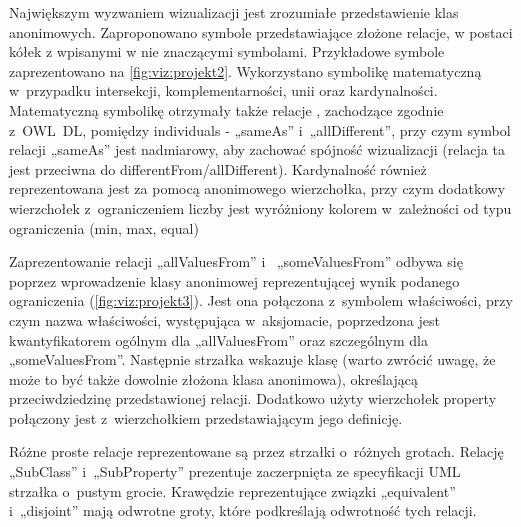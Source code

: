 
\par
Największym wyzwaniem wizualizacji jest zrozumiałe przedstawienie klas anonimowych. Zaproponowano symbole przedstawiające złożone relacje, 
w postaci kółek z wpisanymi w nie znaczącymi symbolami. Przykładowe symbole zaprezentowano na \figurename \space \ref{fig:viz:projekt2}. Wykorzystano symbolikę matematyczną  
w~przypadku intersekcji, komplementarności, unii oraz kardynalności. Matematyczną symbolikę otrzymały także relacje , zachodzące zgodnie z~OWL~DL, 
pomiędzy individuals  - „sameAs” i~„allDifferent”, przy czym symbol relacji „sameAs” jest  nadmiarowy, aby zachować spójność wizualizacji
 (relacja ta jest przeciwna do differentFrom/allDifferent). Kardynalność również reprezentowana jest za pomocą anonimowego wierzchołka, 
przy czym dodatkowy wierzchołek z~ograniczeniem liczby jest wyróżniony kolorem w~zależności od typu ograniczenia (min, max, equal)

\par


Zaprezentowanie relacji „allValuesFrom” i~ „someValuesFrom”  odbywa się poprzez wprowadzenie klasy anonimowej reprezentującej wynik podanego
 ograniczenia (\figurename \space \ref{fig:viz:projekt3}). Jest ona połączona z~symbolem właściwości, przy czym nazwa właściwości, występująca w~aksjomacie, 
 poprzedzona jest kwantyfikatorem
 ogólnym dla  „allValuesFrom” oraz szczególnym dla „someValuesFrom”. Następnie strzałka wskazuje klasę (warto zwrócić uwagę, że może to być także 
dowolnie złożona klasa anonimowa), określającą przeciwdziedzinę przedstawionej relacji. Dodatkowo użyty wierzchołek property połączony jest 
z~wierzchołkiem przedstawiającym jego definicję.


Różne proste relacje reprezentowane są przez strzałki o~różnych grotach. Relację „SubClass” i~„SubProperty” prezentuje zaczerpnięta ze specyfikacji 
UML strzałka o~pustym grocie.  Krawędzie reprezentujące związki „equivalent” i~„disjoint” mają odwrotne groty, które podkreślają odwrotność tych relacji.

